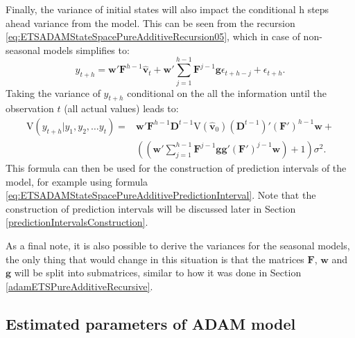 \documentclass[
]{book}
\theoremstyle{definition}
\theoremstyle{definition}
\theoremstyle{definition}
\theoremstyle{definition}
\theoremstyle{remark}
\begin{document}
Finally, the variance of initial states will also impact the conditional h steps ahead variance from the model. This can be seen from the recursion \eqref{eq:ETSADAMStateSpacePureAdditiveRecursion05}, which in case of non-seasonal models simplifies to:
\begin{equation}
    y_{t+h} = \mathbf{w}' \mathbf{F}^{h-1} \hat{\mathbf{v}}_{t} + \mathbf{w}' \sum_{j=1}^{h-1} \mathbf{F}^{j-1} \mathbf{g} \epsilon_{t+h-j} + \epsilon_{t+h} .
  \label{eq:ETSADAMStateSpacePureAdditiveForecastVariance01}
\end{equation}
Taking the variance of \(y_{t+h}\) conditional on the all the information until the observation \(t\) (all actual values) leads to:
\begin{equation}
    \begin{aligned}
    \mathrm{V}( y_{t+h} | y_1, y_2, \dots y_t) = & \mathbf{w}' \mathbf{F}^{h-1} \mathbf{D}^{t-1} \mathrm{V}\left( \hat{\mathbf{v}}_{0} \right) \left(\mathbf{D}^{t-1}\right)' (\mathbf{F}')^{h-1} \mathbf{w} + \\
                                                 & \left( \left(\mathbf{w}' \sum_{j=1}^{h-1} \mathbf{F}^{j-1} \mathbf{g} \mathbf{g}' (\mathbf{F}')^{j-1} \mathbf{w} \right) + 1 \right) \sigma^2 .
    \end{aligned}
  \label{eq:ETSADAMStateSpacePureAdditiveForecastVariance02}
\end{equation}
This formula can then be used for the construction of prediction intervals of the model, for example using formula \eqref{eq:ETSADAMStateSpacePureAdditivePredictionInterval}. Note that the construction of prediction intervals will be discussed later in Section \ref{predictionIntervalsConstruction}.

As a final note, it is also possible to derive the variances for the seasonal models, the only thing that would change in this situation is that the matrices \(\mathbf{F}\), \(\mathbf{w}\) and \(\mathbf{g}\) will be split into submatrices, similar to how it was done in Section \ref{adamETSPureAdditiveRecursive}.

\hypertarget{estimated-parameters-of-adam-model}{%
\subsection{Estimated parameters of ADAM model}\label{estimated-parameters-of-adam-model}}
\end{document}
